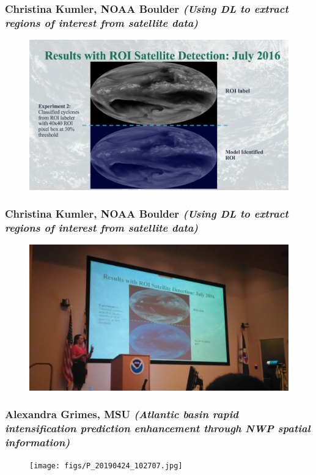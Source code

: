 \documentclass{beamer}
\begin{document}
\begin{frame}
\frametitle{Christina Kumler, NOAA Boulder \textit{(Using DL to extract regions of interest from satellite data)}}
\begin{figure}
	\includegraphics[width=.9\linewidth]{figs/ScreenShot_ROI.png}
\end{figure}
\end{frame}

\begin{frame}
\frametitle{Christina Kumler, NOAA Boulder \textit{(Using DL to extract regions of interest from satellite data)}}
\begin{figure}
	\includegraphics[width=\linewidth]{figs/P_20190424_092340.jpg}
\end{figure}
\end{frame}


\begin{frame}
\frametitle{Alexandra Grimes, MSU \textit{(Atlantic basin rapid intensification prediction enhancement through NWP spatial information)}}
\begin{figure}
	\texttt{[image: figs/P\_20190424\_102707.jpg]}
\end{figure}
\end{frame}
\end{document}
